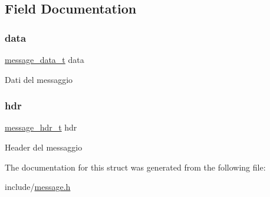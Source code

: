\subsection{Field Documentation}
\mbox{\label{structmessage__t_a4e61df2d2b915250fd442d19a80ca4ca}} 
\subsubsection{\texorpdfstring{data}{data}}
{\footnotesize\ttfamily \hyperlink{structmessage__data__t}{message\+\_\+data\+\_\+t} data}

Dati del messaggio \mbox{\label{structmessage__t_ad467c1444d361c52dd802f5609aa9f4c}} 
\subsubsection{\texorpdfstring{hdr}{hdr}}
{\footnotesize\ttfamily \hyperlink{structmessage__hdr__t}{message\+\_\+hdr\+\_\+t} hdr}

Header del messaggio 

The documentation for this struct was generated from the following file\+:\begin{DoxyCompactItemize}
\item 
include/\hyperlink{message_8h}{message.\+h}\end{DoxyCompactItemize}

